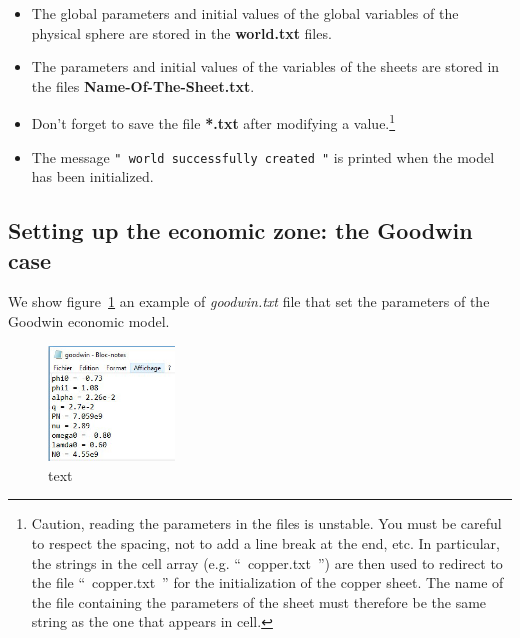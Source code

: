 \documentclass[12pt,a4paper]{article}%
\begin{document}
\begin{itemize}
	\item The global parameters and initial values of the global variables of the physical sphere are stored in the \textbf{world.txt} files.
	
	\item The parameters and initial values of the variables of the sheets are stored in the files \textbf{Name-Of-The-Sheet.txt}.
	
	\item Don't forget to save the file \textbf{*.txt} after modifying a value.\footnote{Caution, reading the parameters in the files is {unstable}. You must be careful to respect the spacing, not to add a line break at the end, etc. In particular, the strings in the cell array (e.g. ``~copper.txt~'') are then used to redirect to the file ``~copper.txt~'' for the initialization of the copper sheet. The name of the file containing the parameters of the sheet must therefore be the same string as the one that appears in cell.}
	
	\item The message \texttt{"~world successfully created~"} is printed when the model has been initialized.
\end{itemize}


\subsection{Setting up the economic zone: the Goodwin case}
We show figure~\ref{fig:SetGoodwinParameters} an example of \textit{goodwin.txt} file that set the parameters of the Goodwin economic model.

\begin{figure}[h]
	\centering
	\includegraphics[width=0.3\textwidth]{figures/Goodwin-txt.png}
	\caption{text}
	\label{fig:SetGoodwinParameters}
\end{figure}
\end{document}
